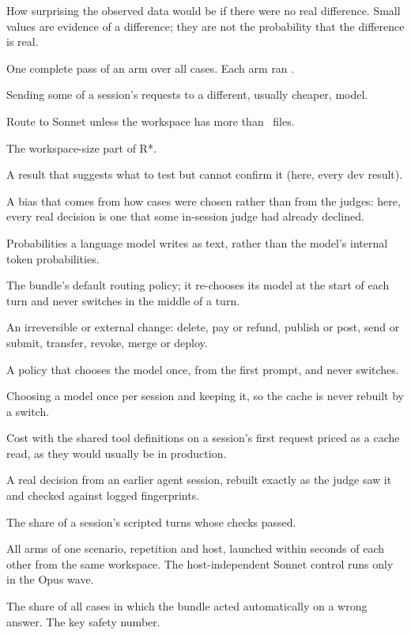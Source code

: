 \begin{description}[style=nextline, leftmargin=1.2em, itemsep=2pt]
  \item[$p$-value] How surprising the observed data would be if there were no real difference. Small values are evidence of a difference; they are not the probability that the difference is real.
  \item[Repetition] One complete pass of an arm over all cases. Each arm ran \HoldReps.
  \item[Routing] Sending some of a session's requests to a different, usually cheaper, model.
  \item[Rule R*] Route to Sonnet unless the workspace has more than \AoScopeFiles\ files.
  \item[Scope gate] The workspace-size part of R*.
  \item[Screen] A result that suggests what to test but cannot confirm it (here, every dev result).
  \item[Selection effect] A bias that comes from how cases were chosen rather than from the judges: here, every real decision is one that some in-session judge had already declined.
  \item[Self-reported probabilities] Probabilities a language model writes as text, rather than the model's internal token probabilities.
  \item[Shipped] The bundle's default routing policy; it re-chooses its model at the start of each turn and never switches in the middle of a turn.
  \item[Side effect] An irreversible or external change: delete, pay or refund, publish or post, send or submit, transfer, revoke, merge or deploy.
  \item[Sticky] A policy that chooses the model once, from the first prompt, and never switches.
  \item[Sticky routing] Choosing a model once per session and keeping it, so the cache is never rebuilt by a switch.
  \item[Tools-normalized cost] Cost with the shared tool definitions on a session's first request priced as a cache read, as they would usually be in production.
  \item[Trace-derived case] A real decision from an earlier agent session, rebuilt exactly as the judge saw it and checked against logged fingerprints.
  \item[Turn-pass fraction] The share of a session's scripted turns whose checks passed.
  \item[Wave] All arms of one scenario, repetition and host, launched within seconds of each other from the same workspace. The host-independent Sonnet control runs only in the Opus wave.
  \item[Wrong-automatic rate] The share of all cases in which the bundle acted automatically on a wrong answer. The key safety number.
\end{description}
